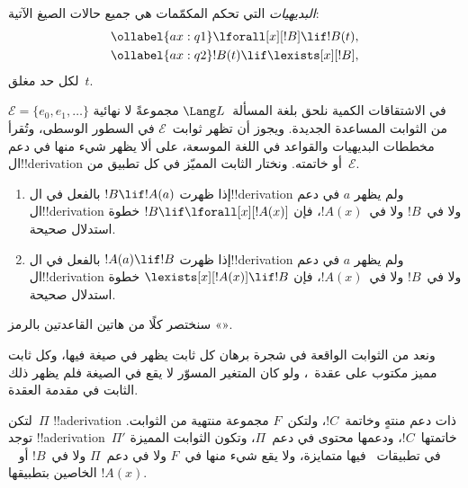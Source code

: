 \documentclass[../../../include/open-logic-section]{subfiles}
\begin{document}


\begin{defn}
\emph{البديهيات} التي تحكم المكمّمات هي جميع حالات الصيغ الآتية:
\begin{align}
\ollabel{ax:q1} & \lforall[x][!B] \lif !B(t), \\
\ollabel{ax:q2} & !B(t) \lif \lexists[x][!B],
\end{align}
لكل حد مغلق~$t$.
\end{defn}

في الاشتقاقات الكمية نلحق بلغة المسألة~$\Lang L$ مجموعةً لا نهائية
$\mathcal E=\{e_0,e_1,\dots\}$ من الثوابت المساعدة الجديدة. ويجوز أن
تظهر ثوابت~$\mathcal E$ في السطور الوسطى، وتُقرأ مخططات البديهيات والقواعد
في اللغة الموسعة، على ألا يظهر شيء منها في دعم ال!!{derivation} أو خاتمته.
ونختار الثابت المميّز في كل تطبيق من~$\mathcal E$.

\begin{defn}[قواعد المكمّمات]
\begin{enumerate}
\item إذا ظهرت $!B \lif !A(a)$ بالفعل في ال!!{derivation} ولم يظهر
  $a$ في دعم ال!!{derivation} ولا في~$!B$ ولا في~$!A(x)$، فإن $!B \lif
  \lforall[x][!A(x)]$ خطوة استدلال صحيحة.
\item إذا ظهرت $!A(a) \lif !B$ بالفعل في ال!!{derivation} ولم يظهر
  $a$ في دعم ال!!{derivation} ولا في~$!B$ ولا في~$!A(x)$، فإن $\lexists[x][!A(x)] \lif
  !B$ خطوة استدلال صحيحة.
\end{enumerate}
\end{defn}

سنختصر كلًا من هاتين القاعدتين بالرمز «\QR».

ونعد من الثوابت الواقعة في شجرة برهان كل ثابت يظهر في صيغة فيها، وكل
ثابت مميز مكتوب على عقدة~\QR{}، ولو كان المتغير المسوّر لا يقع في الصيغة
فلم يظهر ذلك الثابت في مقدمة العقدة.

\begin{lem}
لتكن~$\Pi$ !!a{derivation} ذات دعم منتهٍ وخاتمة~$!C$، ولتكن~$F$
مجموعة منتهية من الثوابت. توجد !!a{derivation}~$\Pi'$ خاتمتها~$!C$،
ودعمها محتوى في دعم~$\Pi$، وتكون الثوابت المميزة في تطبيقات~\QR{} فيها
متمايزة، ولا يقع شيء منها في~$F$ ولا في دعم~$\Pi$ ولا في~$!B$ أو
~$!A(x)$ الخاصين بتطبيقها.
\end{lem}
\end{document}
